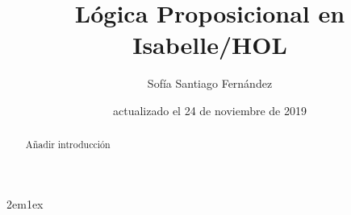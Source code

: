 \documentclass[12pt,a4paper]{article}
\begin{document}
\title{Lógica Proposicional en Isabelle/HOL}
\author{Sofía Santiago Fernández}
\date{actualizado el 24 de noviembre de 2019}
\maketitle

\begin{abstract}
  Añadir introducción
\end{abstract}

\tableofcontents

\parindent 2em\parskip 1ex



\nocite{LMF, tutorial,fitting1996first}


\end{document}
